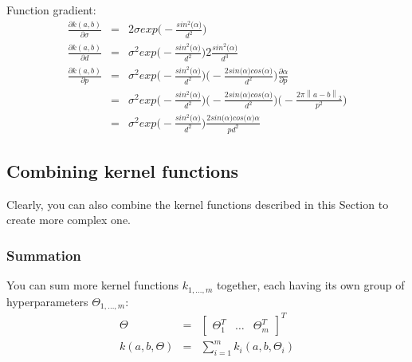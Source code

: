 \documentclass{article}
\begin{document}
Function gradient:
\begin{eqnarray}
\frac{\partial k (a,b)}{\partial \sigma} &=& 2 \sigma exp \bigg ( -\frac{sin^2 \big( \alpha \big)}{d^2}  \bigg ) \\
\frac{\partial k (a,b)}{\partial d} &=& \sigma^2 exp \bigg ( -\frac{sin^2 \big( \alpha \big)}{d^2}  \bigg ) 2 \frac{sin^2 \big( \alpha \big)}{d^3} \\
\frac{\partial k (a,b)}{\partial p} 
&=&  \sigma^2 exp \bigg ( -\frac{sin^2 \big( \alpha \big)}{d^2}  \bigg ) \bigg ( - \frac{2 sin \big( \alpha \big) cos \big( \alpha \big)}{ d^2} \bigg ) \frac{\partial \alpha}{ \partial p} \nonumber \\
&=& \sigma^2 exp \bigg ( -\frac{sin^2 \big( \alpha \big)}{d^2}  \bigg ) \bigg ( - \frac{2 sin \big( \alpha \big) cos \big( \alpha \big)}{ d^2} \bigg ) \bigg ( - \frac{2 \pi \left \| a - b \right \| _2}{p^2} \bigg ) \nonumber \\
&=& \sigma^2 exp \bigg ( -\frac{sin^2 \big( \alpha \big)}{d^2}  \bigg ) \frac{2 sin \big( \alpha \big) cos \big( \alpha \big) \alpha}{p d^2}  
\end{eqnarray}


\subsection{Combining kernel functions}

Clearly, you can also combine the kernel functions described in this Section to create more complex one.

\subsubsection{Summation}

You can sum more kernel functions $k_{1,\hdots,m}$ together, each having its own group of hyperparameters $\Theta_{1,\hdots,m}$:
\begin{eqnarray}
\Theta &=& \begin{bmatrix} \Theta_1^T & \hdots & \Theta_m^T \end{bmatrix}^T \\
k(a,b,\Theta) &=& \sum_{i=1}^m k_i(a,b,\Theta_i)
\end{eqnarray}
\end{document}
